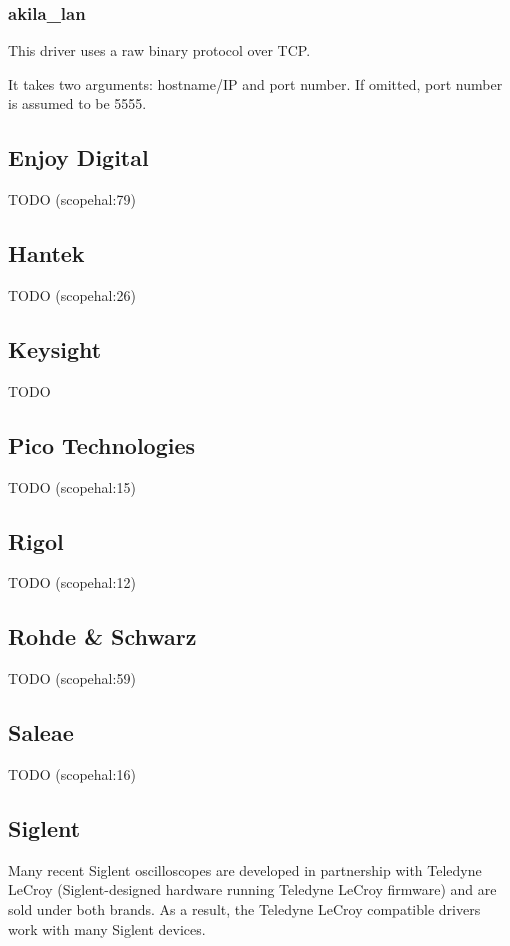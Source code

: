 \subsubsection{akila\_lan}

This driver uses a raw binary protocol over TCP.

It takes two arguments: hostname/IP and port number. If omitted, port number is assumed to be 5555.

\subsection{Enjoy Digital}
TODO (scopehal:79)

\subsection{Hantek}
TODO (scopehal:26)

\subsection{Keysight}
TODO

\subsection{Pico Technologies}
TODO (scopehal:15)

\subsection{Rigol}
TODO (scopehal:12)

\subsection{Rohde \& Schwarz}
TODO (scopehal:59)

\subsection{Saleae}
TODO (scopehal:16)

\subsection{Siglent}

Many recent Siglent oscilloscopes are developed in partnership with Teledyne LeCroy (Siglent-designed hardware running
Teledyne LeCroy firmware) and are sold under both brands. As a result, the Teledyne LeCroy compatible drivers work with
many Siglent devices.\\

